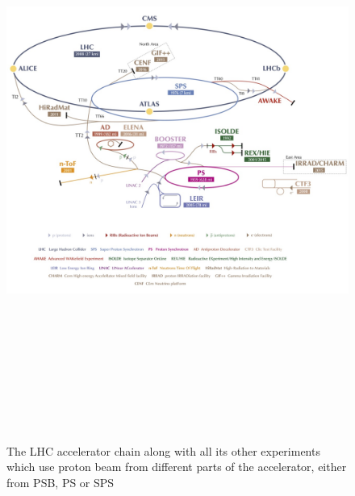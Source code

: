 \begin{figure}[!htbp]
	\centering
	\includegraphics[width=1.15\textwidth,height=19cm]{figures/LHC/CERN_Accelerator_Complex-v2016.jpg}
	\caption{The LHC accelerator chain along with all its other experiments which use proton beam from different parts of the accelerator, either from PSB, PS or SPS~\cite{Fig-CERN-accelerator-complex}}
	\label{fig:CERN-accelerator-complex}
\end{figure}
